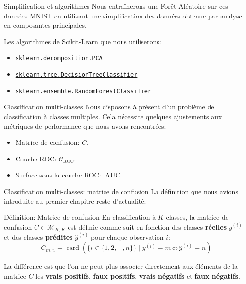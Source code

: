 \begin{frame}{Simplification et algorithmes}
	Nous entraînerons une Forêt Aléatoire sur ces données MNIST en utilisant une simplification des données obtenue par analyse en composantes principales.

	\vspace{0.5cm}

	Les algorithmes de Scikit-Learn que nous utiliserons:
	\begin{itemize}
		\item \href{https://scikit-learn.org/stable/modules/generated/sklearn.decomposition.PCA.html}{\texttt{sklearn.decomposition.PCA}}
		\item \href{https://scikit-learn.org/stable/modules/generated/sklearn.tree.DecisionTreeClassifier.html}{\texttt{sklearn.tree.DecisionTreeClassifier}}
		\item \href{https://scikit-learn.org/stable/modules/generated/sklearn.ensemble.RandomForestClassifier.html}{\texttt{sklearn.ensemble.RandomForestClassifier}}
	\end{itemize}
\end{frame}

\begin{frame}{Classification multi-classes}
	Nous disposons à présent d'un problème de classification à classes multiples. Cela nécessite quelques ajustements aux métriques de performance que nous avons rencontrées:
	\begin{itemize}
		\item Matrice de confusion: $C$.
		\item Courbe ROC: $\mathcal{C}_{\text{ROC}}$.
		\item Surface sous la courbe ROC: $\operatorname{AUC}$.
	\end{itemize}
\end{frame}

\begin{frame}{Classification multi-classes: matrice de confusion}
	La définition que nous avions introduite au premier chapitre reste d'actualité:
	\begin{block}{Définition: Matrice de confusion}
		En classification à $K$ classes, la matrice de confusion $C \in \mathcal{M}_{K,K}$ est définie comme suit en fonction des classes \textbf{réelles} $y^{(i)}$ et des classes \textbf{prédites} $\hat{y}^{(i)}$ pour chaque observation $i$:
		\begin{equation}
			C_{m,n} = \operatorname{card} \left( \{i \in \{1, 2, \cdots, n\}\} \mid y^{(i)} = m \, \text{et} \, \hat{y}^{(i)} = n \right)
			\nonumber
		\end{equation}
	\end{block}
	\vspace{0.5cm}
	\pause
	La différence est que l'on ne peut plus associer directement aux éléments de la matrice $C$ les \textbf{vrais positifs}, \textbf{faux positifs}, \textbf{vrais négatifs} et \textbf{faux négatifs}.
\end{frame}

